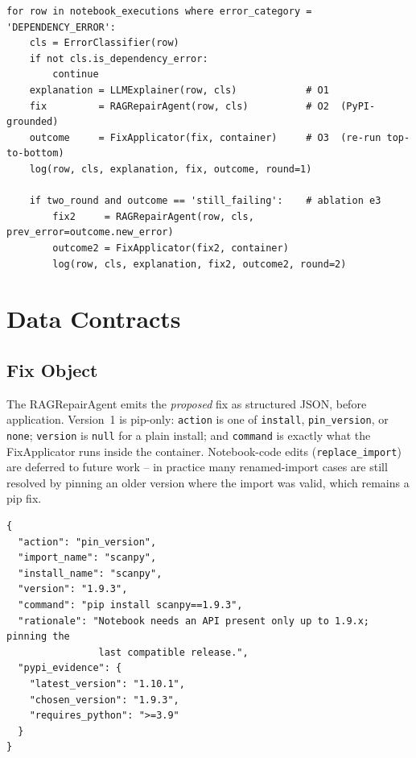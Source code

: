 \begin{verbatim}
for row in notebook_executions where error_category = 'DEPENDENCY_ERROR':
    cls = ErrorClassifier(row)
    if not cls.is_dependency_error:
        continue
    explanation = LLMExplainer(row, cls)            # O1
    fix         = RAGRepairAgent(row, cls)          # O2  (PyPI-grounded)
    outcome     = FixApplicator(fix, container)     # O3  (re-run top-to-bottom)
    log(row, cls, explanation, fix, outcome, round=1)

    if two_round and outcome == 'still_failing':    # ablation e3
        fix2     = RAGRepairAgent(row, cls, prev_error=outcome.new_error)
        outcome2 = FixApplicator(fix2, container)
        log(row, cls, explanation, fix2, outcome2, round=2)
\end{verbatim}

\section{Data Contracts}
\label{sec:data-contracts}

\subsection{Fix Object}
\label{subsec:fix-object}

The RAGRepairAgent emits the \emph{proposed} fix as structured JSON,
before application. Version~1 is pip-only: \texttt{action} is one of
\texttt{install}, \texttt{pin\_version}, or \texttt{none}; \texttt{version}
is \texttt{null} for a plain install; and \texttt{command} is exactly what
the FixApplicator runs inside the container. Notebook-code edits
(\texttt{replace\_import}) are deferred to future work -- in practice many
renamed-import cases are still resolved by pinning an older version where
the import was valid, which remains a pip fix.

\begin{verbatim}
{
  "action": "pin_version",
  "import_name": "scanpy",
  "install_name": "scanpy",
  "version": "1.9.3",
  "command": "pip install scanpy==1.9.3",
  "rationale": "Notebook needs an API present only up to 1.9.x; pinning the
                last compatible release.",
  "pypi_evidence": {
    "latest_version": "1.10.1",
    "chosen_version": "1.9.3",
    "requires_python": ">=3.9"
  }
}
\end{verbatim}

